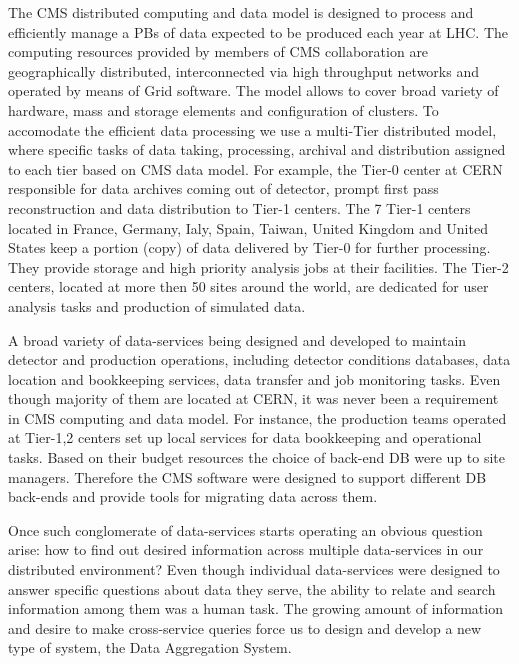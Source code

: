 \documentclass[a4paper]{jpconf}
\begin{document}
The CMS distributed computing and data model \cite{CMSDataModel} 
is designed to process
and efficiently manage a PBs of data expected to be produced each year
at LHC. The computing resources provided by members of CMS
collaboration are geographically distributed, 
interconnected via high throughput networks and operated by means 
of Grid software. The model allows to cover broad variety of
hardware, mass and storage elements and configuration of
clusters. To accomodate the efficient data processing we use 
a multi-Tier distributed model, where specific tasks of data taking,
processing, archival and distribution assigned to each tier based
on CMS data model. For example, the Tier-0 center at CERN responsible
for data archives coming out of detector, prompt first pass reconstruction
and data distribution to Tier-1 centers. The 7 Tier-1 centers
located in France, Germany, Ialy, Spain, Taiwan, United Kingdom and United States
keep a portion (copy) of data delivered by Tier-0 for further processing.
They provide storage and high priority analysis jobs at their facilities.
The Tier-2 centers, located at more then 50 sites around the world,
are dedicated for user analysis tasks and production of simulated data.

A broad variety of data-services being designed and developed to
maintain detector and production operations, including detector
conditions databases, data location and bookkeeping services,
data transfer and job monitoring tasks. Even though majority of them
are located at CERN, it was never been a requirement in CMS computing
and data model. For instance, the production teams operated at Tier-1,2
centers set up local services for data bookkeeping and operational
tasks. Based on their budget resources the choice of back-end DB were
up to site managers. Therefore the CMS software were designed to support different
DB back-ends and provide tools for migrating data across them.

Once such conglomerate of data-services starts operating an obvious
question arise: how to find out desired information across multiple data-services
in our distributed environment? Even though individual data-services were designed
to answer specific questions about data they serve, the ability to relate and search
information among them was a human task. The growing amount of information
and desire to make cross-service queries force us to design and develop a new
type of system, the Data Aggregation System.
\end{document}
